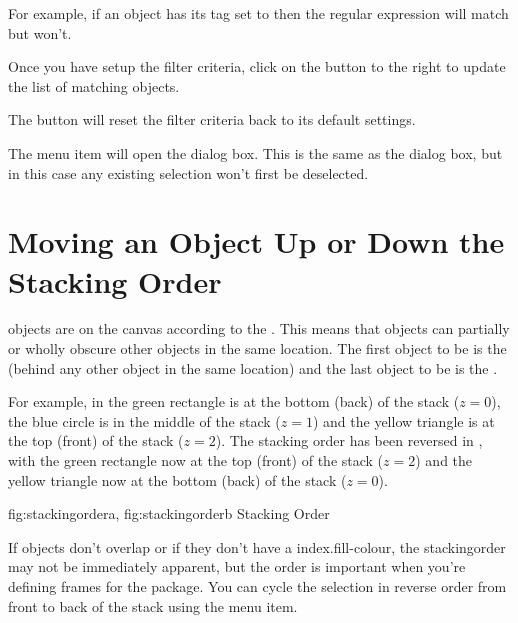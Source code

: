 For example, if an object has its tag set to  then
the regular expression  will match but  won't.


Once you have setup the filter criteria, click on the
 button to the right to update the
list of matching objects.

The  button will reset the filter
criteria back to its default settings.


The  menu item will open the
 dialog box. This is the same
as the  dialog box, but in this case any
existing selection won't first be deselected.

\section{Moving an Object Up or Down the Stacking Order}\label{sec:moveupordown}

\Glspl{object} are  on the
\gls{canvas} according to the
. This means that objects can
partially or wholly obscure other objects in the same location.
The first object to be 
is the  (behind any other object in the same
location) and the last object to be 
is the .

For example, in  the green rectangle is
at the bottom (\gls{back}) of the stack ($z=0$), the blue circle is in
the middle of the stack ($z=1$) and the yellow triangle is at the
top (\gls{front}) of the stack ($z=2$). The stacking order has
been reversed in , with the green
rectangle now at the top (front) of the stack ($z=2$) and
the yellow triangle now at the bottom (back) of the stack
($z=0$).

{
  {fig:stackingordera}{}{},
  {fig:stackingorderb}{}{}
}
{Stacking Order}

If \glspl{object} don't overlap or if they don't have a
\gls{index.fill-colour}, the \gls{stackingorder} may not be
immediately apparent, but the order is important when you're
defining frames for the  package. You can cycle the
selection in reverse order from front to back of the stack using the
 menu item.

